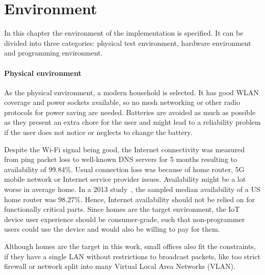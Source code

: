 \chapter{Environment}
\label{chapter:environment}


In this chapter the environment of the implementation is specified. It can be divided into three categories: physical test environment, hardware environment and programming environment.


\subsubsection*{Physical environment}
As the physical environment, a modern household is selected. It has good WLAN coverage and power sockets available, so no mesh networking or other radio protocols for power saving are needed. Batteries are avoided as much as possible as they present an extra chore for the user and might lead to a reliability problem if the user does not notice or neglects to change the battery.

Despite the Wi-Fi signal being good, the Internet connectivity was measured from ping packet loss to well-known DNS servers for 5 months resulting to availability of 99.84\%. Usual connection loss was because of home router, 5G mobile network or Internet service provider issues. Availability might be a lot worse in average home. In a 2013 study~\cite{Peeking_behind_the_NAT}, the sampled median availability of a US home router was 98.27\%. Hence, Internet availability should not be relied on for functionally critical parts. Since homes are the target environment, the IoT device user experience should be consumer-grade, such that non-programmer users could use the device and would also be willing to pay for them. 

Although homes are the target in this work, small offices also fit the constraints, if they have a single LAN without restrictions to broadcast packets, like too strict firewall or network split into many Virtual Local Area Networks (VLAN).


